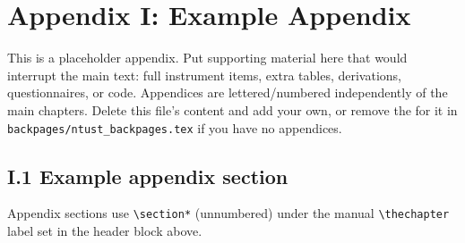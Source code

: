 \newpage
\chapter*{Appendix I: Example Appendix}
\renewcommand{\thechapter}{I}

\setcounter{equation}{0}
\setcounter{figure}{0}
\setcounter{footnote}{0}
\setcounter{section}{0}
\setcounter{subsection}{0}
\setcounter{subsubsection}{0}
\setcounter{table}{0}

This is a placeholder appendix. Put supporting material here that would
interrupt the main text: full instrument items, extra tables, derivations,
questionnaires, or code. Appendices are lettered/numbered independently of the
main chapters. Delete this file's content and add your own, or remove the
\verb|| for it in \texttt{backpages/ntust\_backpages.tex} if you have no
appendices.

\section*{I.1 Example appendix section}

Appendix sections use \verb|\section*| (unnumbered) under the manual
\texttt{\textbackslash thechapter} label set in the header block above.
